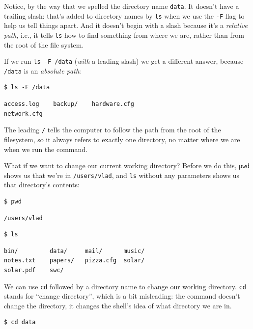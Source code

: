 \documentclass[]{book}
\newcommand{\gdef}[2]{\emph{#2}}
\begin{document}
Notice, by the way that we spelled the directory name \texttt{data}. It
doesn't have a trailing slash: that's added to directory names by
\texttt{ls} when we use the \texttt{-F} flag to help us tell things
apart. And it doesn't begin with a slash because it's a
\gdef{g:relative-path}{relative path}, i.e., it tells \texttt{ls}
how to find something from where we are, rather than from the root of
the file system.

If we run \texttt{ls -F /data} (\emph{with} a leading slash) we get a
different answer, because \texttt{/data} is an
\gdef{g:absolute-path}{absolute path}:

\begin{verbatim}
$ ls -F /data
\end{verbatim}

\begin{verbatim}
access.log    backup/    hardware.cfg
network.cfg
\end{verbatim}

The leading \texttt{/} tells the computer to follow the path from the
root of the filesystem, so it always refers to exactly one directory, no
matter where we are when we run the command.

What if we want to change our current working directory? Before we do
this, \texttt{pwd} shows us that we're in \texttt{/users/vlad}, and
\texttt{ls} without any parameters shows us that directory's contents:

\begin{verbatim}
$ pwd
\end{verbatim}

\begin{verbatim}
/users/vlad
\end{verbatim}

\begin{verbatim}
$ ls
\end{verbatim}

\begin{verbatim}
bin/         data/     mail/      music/
notes.txt    papers/   pizza.cfg  solar/
solar.pdf    swc/
\end{verbatim}

We can use \texttt{cd} followed by a directory name to change our
working directory. \texttt{cd} stands for ``change directory'', which is
a bit misleading: the command doesn't change the directory, it changes
the shell's idea of what directory we are in.

\begin{verbatim}
$ cd data
\end{verbatim}
\end{document}
